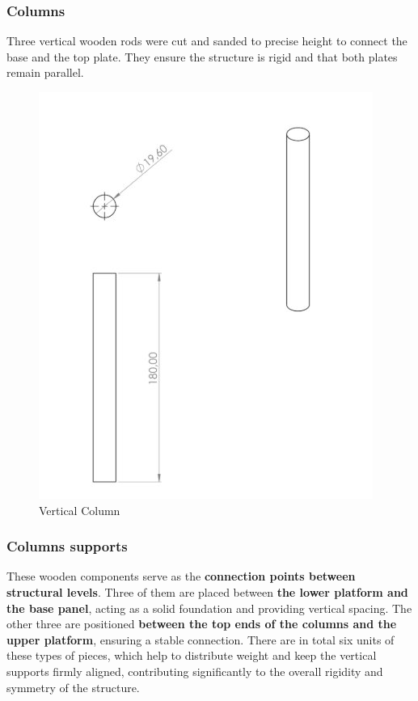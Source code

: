 \subsubsection{Columns}
Three vertical wooden rods were cut and sanded to precise height to connect the base and the top plate. They ensure the structure is rigid and that both plates remain parallel.

\begin{figure}[H]
    \centering
    \includegraphics[width=0.6\linewidth]{../ReportMovementModule/images/Aspose.Words.728084da-df58-4b9d-a372-f65cffbdb23d.021.jpeg}
    \caption{Vertical Column}
\end{figure}

\subsubsection{Columns supports}
These wooden components serve as the \textbf{connection points between structural levels}. Three of them are placed between \textbf{the lower platform and the base panel}, acting as a solid foundation and providing vertical spacing. The other three are positioned \textbf{between the top ends of the columns and the upper platform}, ensuring a stable connection. There are in total six units of these types of pieces, which help to distribute weight and keep the vertical supports firmly aligned, contributing significantly to the overall rigidity and symmetry of the structure.

